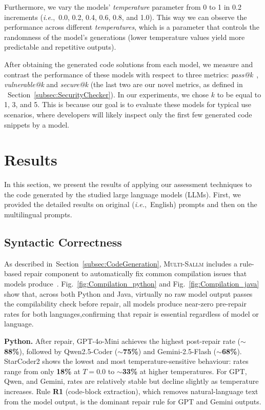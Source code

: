 \documentclass[pdflatex,sn-mathphys-ay]{sn-jnl}
\newcommand{\figref}[1]{Fig.~\ref{#1}}
\newcommand{\secref}[1]{Section~\ref{#1}}
\newcommand{\ie}{\textit{i.e.},\ }
\newcommand{\sandoval}[0]{\textsc{Multi-Sallm}}
\begin{document}
Furthermore,  we vary the models'  \textit{temperature} parameter from 0 to 1 in 0.2 increments (\ie 0.0, 0.2, 0.4, 0.6, 0.8, and 1.0). This way we can observe the performance across different \textit{temperatures}, which is a parameter that controls the randomness of the model's generations (lower temperature values yield more predictable and repetitive outputs). 


After obtaining the generated code solutions from each model, we measure and contrast the performance of these models with respect to three metrics: \textit{pass@k}~\cite{chen2021codex}, \textit{vulnerable@k}
and \textit{secure@k} (the last two are our novel metrics, as defined in ~\secref{subsec:SecurityChecker}). 
In our experiments, we chose $k$ to be equal to 1, 3, and 5. 
This is because our goal is to evaluate these models for typical use scenarios, where developers will likely inspect only the first few generated code snippets by a model. 

% 
\section{Results}\label{sec:results}



In this section, we present the results of applying our assessment techniques to the code generated by the studied large language models (LLMs). First, we provided the detailed results on original (\ie English) prompts and then on the multilingual prompts.


\subsection{Syntactic Correctness}

As described in~\secref{subsec:CodeGeneration}, \sandoval{} includes a rule-based repair component to automatically fix common compilation issues that models produce~\cite{siddiq2023exploring}. \figref{fig:Compilation_python} and \figref{fig:Compilation_java}  show that, across both Python and Java, virtually no raw model output passes the compilability check before repair, all models produce near-zero pre-repair rates for both languages,confirming that repair is essential regardless of model or language.

\textbf{Python.} After repair, GPT-4o-Mini achieves the highest post-repair rate (\textbf{$\sim$88\%}), followed by Qwen2.5-Coder (\textbf{$\sim$75\%}) and Gemini-2.5-Flash (\textbf{$\sim$68\%}). StarCoder2 shows the lowest and most temperature-sensitive behaviour: rates range from only \textbf{18\%} at $T\!=\!0.0$ to \textbf{$\sim$33\%} at higher temperatures. For GPT, Qwen, and Gemini, rates are relatively stable but decline slightly as temperature increases. Rule \textbf{R1} (code-block extraction), which removes natural-language text from the model output, is the dominant repair rule for GPT and Gemini outputs.
\end{document}
